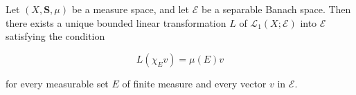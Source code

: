 Let $(X, \mathbf{S}, \mu)$ be a measure space, and let $\mathcal{E}$ be a separable Banach space. Then there exists a unique bounded linear transformation $L$ of $\mathcal{L}_1(X; \mathcal{E})$ into $\mathcal{E}$ satisfying the condition

$$L(\chi_E v) = \mu(E) v$$

for every measurable set $E$ of finite measure and every vector $v$ in $\mathcal{E}$.
